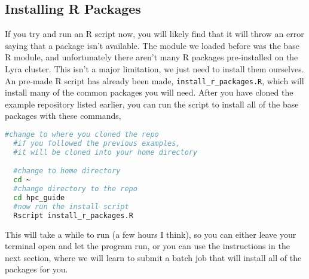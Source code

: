 \subsection{Installing R Packages}
If you try and run an R script now, you will likely find that it will throw an error saying that a package isn't available. The module we loaded before was the base R module, and unfortunately there aren't many R packages pre-installed on the Lyra cluster. This isn't a major limitation, we just need to install them ourselves. An pre-made R script has already been made, \texttt{install\_r\_packages.R}, which will install many of the common packages you will need. After you have cloned the example repository listed earlier, you can run the script to install all of the base packages with these commands,
\begin{lstlisting}[language=bash, frame=single]
  #change to where you cloned the repo
  #if you followed the previous examples,
  #it will be cloned into your home directory

  #change to home directory
  cd ~
  #change directory to the repo
  cd hpc_guide
  #now run the install script
  Rscript install_r_packages.R
\end{lstlisting}
%
%
This will take a while to run (a few hours I think), so you can either leave your terminal open and let the program run, or you can use the instructions in the next section, where we will learn to submit a batch job that will install all of the packages for you.
%
%
